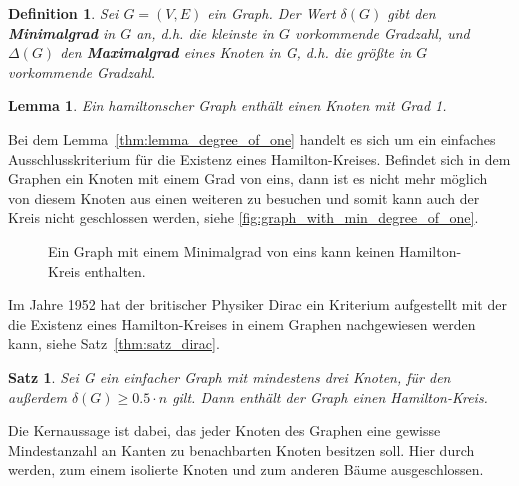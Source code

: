 \documentclass{article}
\newtheorem{mydef}{Definition}
\newtheorem{mylem}{Lemma}
\newtheorem{mysat}{Satz}
\begin{document}
\begin{mydef}
	Sei $G=(V,E)$ ein Graph. Der Wert $\delta(G)$ gibt den \textbf{Minimalgrad} in $G$ an, d.h. die kleinste in $G$ vorkommende Gradzahl, und $\Delta(G)$ den \textbf{Maximalgrad} eines Knoten in G, d.h. die größte in $G$ vorkommende Gradzahl. \cite{busing2010graphen}
\end{mydef}






\begin{mylem}\label{thm:lemma_degree_of_one}
	Ein hamiltonscher Graph enthält einen Knoten mit Grad 1.
\end{mylem}

Bei dem Lemma~\autoref{thm:lemma_degree_of_one} handelt es sich um ein einfaches Ausschlusskriterium für die Existenz eines Hamilton-Kreises. Befindet sich in dem Graphen ein Knoten mit einem Grad von eins, dann ist es nicht mehr möglich von diesem Knoten aus einen weiteren zu besuchen und somit kann auch der Kreis nicht geschlossen werden, siehe \autoref{fig:graph_with_min_degree_of_one}.

\begin{figure}[h]
	\centering
	\caption{Ein Graph mit einem Minimalgrad von eins kann keinen Hamilton-Kreis enthalten.}
	\label{fig:graph_with_min_degree_of_one}
\end{figure}

Im Jahre 1952 hat der britischer Physiker Dirac ein Kriterium aufgestellt mit der die Existenz eines Hamilton-Kreises in einem Graphen nachgewiesen werden kann, siehe Satz~\autoref{thm:satz_dirac}.

\begin{mysat}\label{thm:satz_dirac}
	Sei G ein einfacher Graph mit mindestens drei Knoten, für den außerdem $\delta(G)\geq 0.5\cdot n$ gilt. Dann enthält der Graph einen Hamilton-Kreis.
\end{mysat}

Die Kernaussage ist dabei, das jeder Knoten des Graphen eine gewisse Mindestanzahl an Kanten zu benachbarten Knoten besitzen soll. Hier durch werden, zum einem isolierte Knoten und zum anderen Bäume ausgeschlossen.
\end{document}
